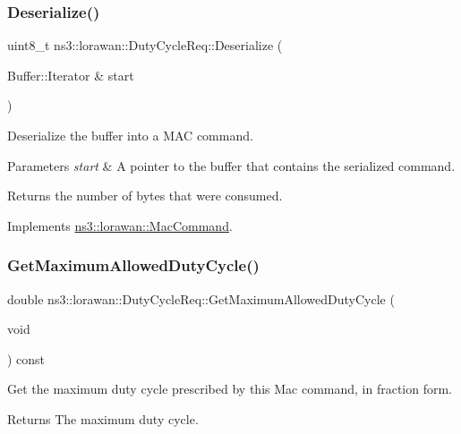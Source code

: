 \subsubsection{\texorpdfstring{Deserialize()}{Deserialize()}}
{\footnotesize\ttfamily uint8\+\_\+t ns3\+::lorawan\+::\+Duty\+Cycle\+Req\+::\+Deserialize (\begin{DoxyParamCaption}\item[{Buffer\+::\+Iterator \&}]{start }\end{DoxyParamCaption})\hspace{0.3cm}{\ttfamily [virtual]}}

Deserialize the buffer into a M\+AC command.


\begin{DoxyParams}{Parameters}
{\em start} & A pointer to the buffer that contains the serialized command. \\
\hline
\end{DoxyParams}
\begin{DoxyReturn}{Returns}
the number of bytes that were consumed. 
\end{DoxyReturn}


Implements \hyperlink{classns3_1_1lorawan_1_1MacCommand_af12d223a71a67196bce498f1240eda75}{ns3\+::lorawan\+::\+Mac\+Command}.

\mbox{\label{classns3_1_1lorawan_1_1DutyCycleReq_ab42bcc06f2f90bac5aaf3a267fed20e8}} 
\subsubsection{\texorpdfstring{Get\+Maximum\+Allowed\+Duty\+Cycle()}{GetMaximumAllowedDutyCycle()}}
{\footnotesize\ttfamily double ns3\+::lorawan\+::\+Duty\+Cycle\+Req\+::\+Get\+Maximum\+Allowed\+Duty\+Cycle (\begin{DoxyParamCaption}\item[{void}]{ }\end{DoxyParamCaption}) const}

Get the maximum duty cycle prescribed by this Mac command, in fraction form.

\begin{DoxyReturn}{Returns}
The maximum duty cycle. 
\end{DoxyReturn}
\mbox{\label{classns3_1_1lorawan_1_1DutyCycleReq_a8d0d86de5e54eab057bcdd9b79c97aa9}} 
